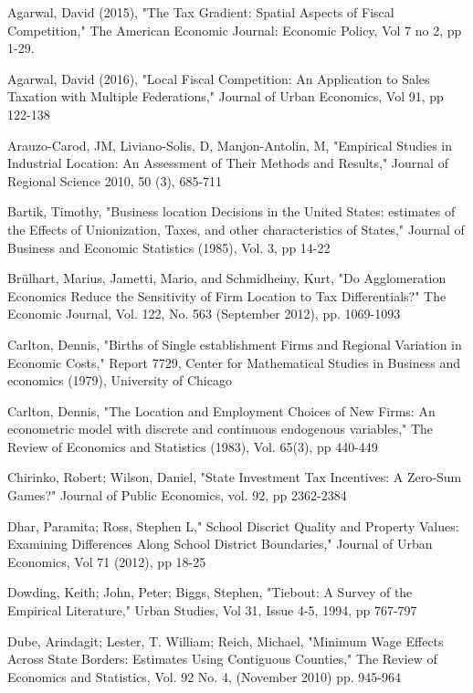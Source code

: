 \documentclass[12pt,a4paper]{article}
\begin{document}
\newpage
\begin{thebibliography}{99}

Agarwal, David (2015), "The Tax Gradient: Spatial Aspects of Fiscal Competition," The American Economic Journal: Economic Policy, Vol 7 no 2, pp 1-29.

Agarwal, David (2016), "Local Fiscal Competition: An Application to Sales Taxation with Multiple Federations," Journal of Urban Economics, Vol 91, pp 122-138

Arauzo-Carod, JM, Liviano-Solis, D, Manjon-Antolin, M, "Empirical Studies in Industrial Location: An Assessment of Their Methods and Results," Journal of Regional Science 2010, 50 (3), 685-711

Bartik, Timothy, "Business location Decisions in the United States: estimates of the Effects of Unionization, Taxes, and other characteristics of States," Journal of Business and Economic Statistics (1985), Vol. 3, pp 14-22

Brülhart, Marius, Jametti, Mario, and Schmidheiny, Kurt, "Do Agglomeration Economics Reduce the Sensitivity of Firm Location to Tax Differentials?" The Economic Journal, Vol. 122, No. 563 (September 2012), pp. 1069-1093

Carlton, Dennis, "Births of Single establishment Firms and Regional Variation in Economic Costs," Report 7729, Center for Mathematical Studies in Business and economics (1979), University of Chicago

Carlton, Dennis, "The Location and Employment Choices of New Firms: An econometric model with discrete and continuous endogenous variables," The Review of Economics and Statistics (1983), Vol. 65(3), pp 440-449

Chirinko, Robert; Wilson, Daniel, "State Investment Tax Incentives: A Zero-Sum Games?" Journal of Public Economics, vol. 92, pp 2362-2384

Dhar, Paramita; Ross, Stephen L," School Discrict Quality and Property Values: Examining Differences Along School District Boundaries," Journal of Urban Economics, Vol 71 (2012), pp 18-25

Dowding, Keith; John, Peter; Biggs, Stephen, "Tiebout: A Survey of the Empirical Literature," Urban Studies, Vol 31, Issue 4-5, 1994, pp 767-797

Dube, Arindagit; Lester, T. William; Reich, Michael, "Minimum Wage Effects Across State Borders: Estimates Using Contiguous Counties," The Review of Economics and Statistics, Vol. 92 No. 4, (November 2010) pp. 945-964


\end{thebibliography}
\end{document}

